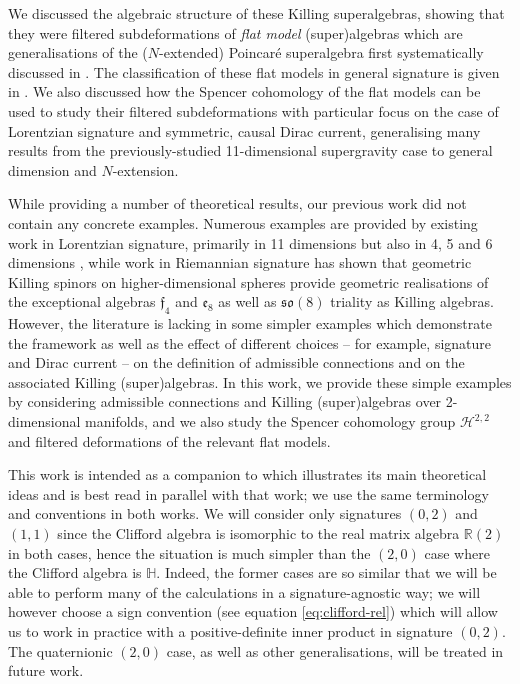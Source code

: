 \documentclass[pdftex]{sigma}
\numberwithin{equation}{section}
\newcommand{\fso}{\mathfrak{so}}
\newcommand{\RR}{\mathbb{R}}
\newcommand{\HH}{\mathbb{H}}
\newcommand{\cH}{\mathcal{H}}
\newcommand{\1}{\mathbbm{1}}
\begin{document}
We discussed the algebraic structure of these Killing superalgebras, showing \cite[Theorem~3.10]{Beckett2024_2} that they were filtered subdeformations of \emph{flat model} (super)algebras which are generalisations of the ($N$-extended) Poincar\'e superalgebra first systematically discussed in \cite{Strathdee1986}. The classification of these flat models in general signature is given in \cite{Alekseevsky1997}. We also discussed how the Spencer cohomology of the flat models can be used to study their filtered subdeformations with particular focus on the case of Lorentzian signature and symmetric, causal Dirac current, generalising many results from the previously-studied 11-dimensional supergravity case \cite{Figueroa-OFarrill2017_1} to general dimension and $N$-extension.

While providing a number of theoretical results, our previous work \cite{Beckett2024_2} did not contain any concrete examples. Numerous examples are provided by existing work in Lorentzian signature, primarily in 11 dimensions \cite{Figueroa-OFarrill2016,Figueroa-OFarrill2017_1,Figueroa-OFarrill2017,Santi2022} but also in 4, 5 and 6 dimensions \cite{Beckett2019,deMedeiros2016,deMedeiros2018}, while work in Riemannian signature \cite{Figueroa-OFarrill2008_except} has shown that geometric Killing spinors on higher-dimensional spheres provide geometric realisations of the exceptional algebras $\mathfrak{f}_4$ and $\mathfrak{e}_8$ as well as $\fso(8)$ triality as Killing algebras. However, the literature is lacking in some simpler examples which demonstrate the framework as well as the effect of different choices -- for example, signature and Dirac current -- on the definition of admissible connections and on the associated Killing (super)algebras. In this work, we provide these simple examples by considering admissible connections and Killing (super)algebras over 2-dimensional manifolds, and we also study the Spencer cohomology group $\cH^{2,2}$ and filtered deformations of the relevant flat models.

This work is intended as a companion to \cite{Beckett2024_2} which illustrates its main theoretical ideas and is best read in parallel with that work; we use the same terminology and conventions in both works. We will consider only signatures $(0,2)$ and $(1,1)$ since the Clifford algebra is isomorphic to the real matrix algebra $\RR(2)$ in both cases, hence the situation is much simpler than the $(2,0)$ case where the Clifford algebra is $\HH$. Indeed, the former cases are so similar that we will be able to perform many of the calculations in a signature-agnostic way; we will however choose a sign convention (see equation \eqref{eq:clifford-rel}) which will allow us to work in practice with a positive-definite inner product in signature $(0,2)$. The quaternionic $(2,0)$ case, as well as other generalisations, will be treated in future work.
\end{document}
